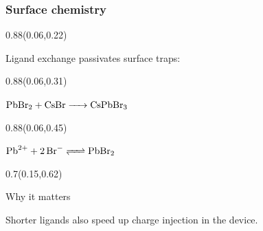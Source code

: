 \documentclass[aspectratio=169]{beamer}
\begin{document}
\begin{frame}[t]
  \frametitle{Surface chemistry}

\begin{textblock}{0.88}(0.06,0.22)
{\raggedright\fontsize{16}{19}\selectfont Ligand exchange passivates surface traps:\par}
\end{textblock}

\begin{textblock}{0.88}(0.06,0.31)
{\centering\fontsize{20}{24}\selectfont $\ce{PbBr2 + CsBr -> CsPbBr3}$\par}
\end{textblock}

\begin{textblock}{0.88}(0.06,0.45)
{\centering\fontsize{20}{24}\selectfont $\ce{Pb^2+ + 2Br- <=> PbBr2}$\par}
\end{textblock}

\begin{textblock}{0.7}(0.15,0.62)
{\begin{alertblock}{Why it matters}\raggedright\fontsize{15}{18}\selectfont Shorter ligands also speed up charge injection in the device.\end{alertblock}\par}
\end{textblock}
\end{frame}
\end{document}
